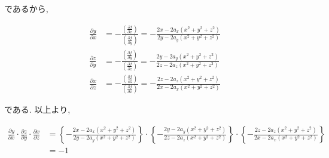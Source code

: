\documentclass[dvipdfmx]{jsarticle}
\begin{document}
であるから, 

\begin{align*}
    \frac{\partial y}{\partial x} &= - \frac{\left(\frac{\partial f}{\partial x}\right)}{\left(\frac{\partial f}{\partial y}\right)} = - \frac{2x - 2a_x(x^2 + y^2 + z^2)}{2y - 2a_y(x^2 + y^2 + z^2)} \\
    \frac{\partial z}{\partial y} &= - \frac{\left(\frac{\partial f}{\partial y}\right)}{\left(\frac{\partial f}{\partial z}\right)} = - \frac{2y - 2a_y(x^2 + y^2 + z^2)}{2z - 2a_z(x^2 + y^2 + z^2)} \\
    \frac{\partial x}{\partial z} &= - \frac{\left(\frac{\partial f}{\partial z}\right)}{\left(\frac{\partial f}{\partial x}\right)} = - \frac{2z - 2a_z(x^2 + y^2 + z^2)}{2x - 2a_x(x^2 + y^2 + z^2)} 
\end{align*}

である. 以上より, 

\begin{align*}
    \frac{\partial y}{\partial x} \cdot \frac{\partial z}{\partial y} \cdot \frac{\partial x}{\partial z} &=  \left\{- \frac{2x - 2a_x(x^2 + y^2 + z^2)}{2y - 2a_y(x^2 + y^2 + z^2)} \right\} \cdot \left\{- \frac{2y - 2a_y(x^2 + y^2 + z^2)}{2z - 2a_z(x^2 + y^2 + z^2)}\right\} \cdot \left\{- \frac{2z - 2a_z(x^2 + y^2 + z^2)}{2x - 2a_x(x^2 + y^2 + z^2)} \right\} \\
    &= -1
\end{align*}
\end{document}
